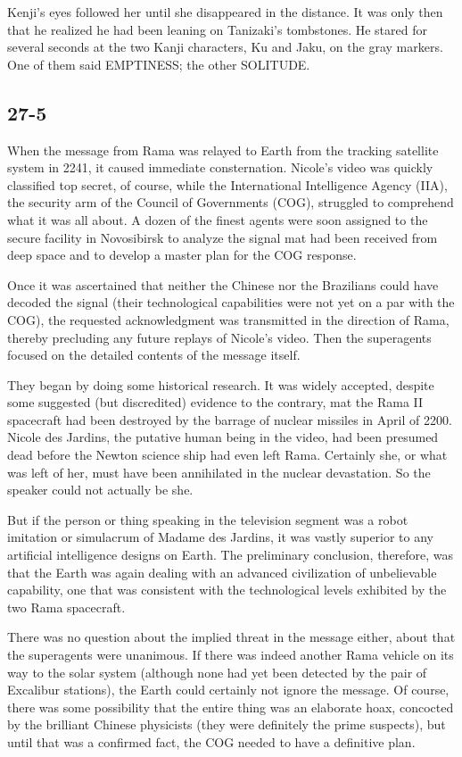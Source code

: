 \documentclass[]{article}
\begin{document}
{Kenji’s eyes followed her until she disappeared in the distance.  It was only then that he realized he had been leaning on Tanizaki’s tombstones.  He stared for several seconds at the two Kanji characters, Ku and Jaku, on the gray markers.  One of them said EMPTINESS; the other SOLITUDE.


\subsection*{27-5}

When the message from Rama was relayed to Earth from the tracking satellite system in 2241, it caused immediate consternation.  Nicole’s video was quickly classified top secret, of course, while the International Intelligence Agency (IIA), the security arm of the Council of Governments (COG), struggled to comprehend what it was all about.  A dozen of the finest agents were soon assigned to the secure facility in Novosibirsk to analyze the signal mat had been received from deep space and to develop a master plan for the COG response.

Once it was ascertained that neither the Chinese nor the Brazilians could have decoded the signal (their technological capabilities were not yet on a par with the COG), the requested acknowledgment was transmitted in the direction of Rama, thereby precluding any future replays of Nicole’s video.  Then the superagents focused on the detailed contents of the message itself.

They began by doing some historical research.  It was widely accepted, despite some suggested (but discredited) evidence to the contrary, mat the Rama II spacecraft had been destroyed by the barrage of nuclear missiles in April of 2200.  Nicole des Jardins, the putative human being in the video, had been presumed dead before the Newton science ship had even left Rama.  Certainly she, or what was left of her, must have been annihilated in the nuclear devastation.  So the speaker could not actually be she.

But if the person or thing speaking in the television segment was a robot imitation or simulacrum of Madame des Jardins, it was vastly superior to any artificial intelligence designs on Earth.  The preliminary conclusion, therefore, was that the Earth was again dealing with an advanced civilization of unbelievable capability, one that was consistent with the technological levels exhibited by the two Rama spacecraft.

There was no question about the implied threat in the message either, about that the superagents were unanimous.  If there was indeed another Rama vehicle on its way to the solar system (although none had yet been detected by the pair of Excalibur stations), the Earth could certainly not ignore the message.  Of course, there was some possibility that the entire thing was an elaborate hoax, concocted by the brilliant Chinese physicists (they were definitely the prime suspects), but until that was a confirmed fact, the COG needed to have a definitive plan.

}
\end{document}
